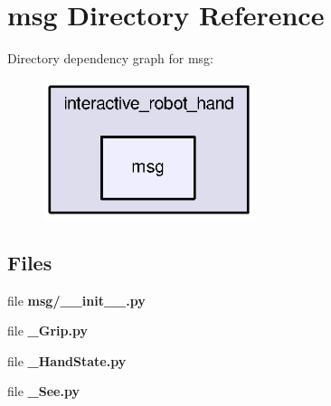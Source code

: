 \section{msg Directory Reference}
\label{dir_3dcaab6184b7aa34cec846c4a957d700}
Directory dependency graph for msg\-:
\nopagebreak
\begin{figure}[H]
\begin{center}
\leavevmode
\includegraphics[width=175pt]{dir_3dcaab6184b7aa34cec846c4a957d700_dep}
\end{center}
\end{figure}
\subsection*{Files}
\begin{DoxyCompactItemize}
\item 
file {\bf msg/\-\_\-\-\_\-init\-\_\-\-\_\-.\-py}
\item 
file {\bf \-\_\-\-Grip.\-py}
\item 
file {\bf \-\_\-\-Hand\-State.\-py}
\item 
file {\bf \-\_\-\-See.\-py}
\end{DoxyCompactItemize}
